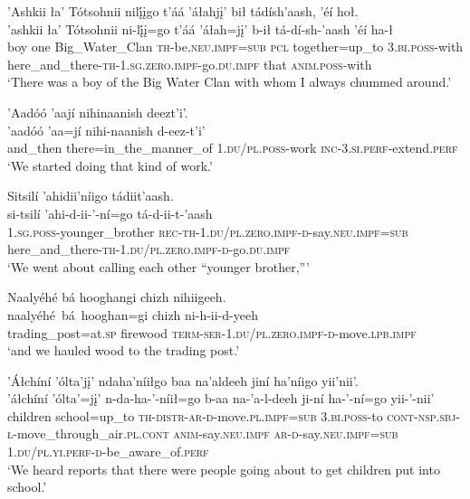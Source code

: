 \ea\label{ex:text1-11-1}
’Ashkii ła’ Tótsohnii nilį́įgo t’áá ’áłahjį’ bił tádísh’aash, ’éí hoł.\\
\gll ’ashkii	ła’	Tótsohnii	ni-lį́į=go	t’áá	’áłah=jį’	b-ił	tá-dí-sh-’aash	’éí	ha-ł\\
     boy	one	Big\_Water\_Clan	\textsc{th}-be.\textsc{neu}.\textsc{impf}=\textsc{sub}	\textsc{pcl}	together=up\_to	3.\textsc{bi}.\textsc{poss}-with	here\_and\_there-\textsc{th}-1.\textsc{sg}.\textsc{zero}.\textsc{impf}-go.\textsc{du}.\textsc{impf}	that	\textsc{anim}.\textsc{poss}-with\\
\glt `There was a boy of the Big Water Clan with whom I always chummed around.'
\z

\ea\label{ex:text1-11-2}
’Aadóó ’aají nihinaanish deezt’i’.\\
\gll ’aadóó	’aa=jí	nihi-naanish	d-eez-t’i’\\
     and\_then	there=in\_the\_manner\_of	1.\textsc{du}/\textsc{pl}.\textsc{poss}-work	\textsc{inc}-3.\textsc{si}.\textsc{perf}-extend.\textsc{perf}\\
\glt `We started doing that kind of work.'
\z

\ea\label{ex:text1-11-3}
Sitsilí ’ahidii’níigo tádiit’aash.\\
\gll si-tsilí	’ahi-d-ii-’-ní=go	tá-d-ii-t-’aash\\
     1.\textsc{sg}.\textsc{poss}-younger\_brother	\textsc{rec}-\textsc{th}-1.\textsc{du}/\textsc{pl}.\textsc{zero}.\textsc{impf}-\textsc{d}-say.\textsc{neu}.\textsc{impf}=\textsc{sub}	here\_and\_there-\textsc{th}-1.\textsc{du}/\textsc{pl}.\textsc{zero}.\textsc{impf}-\textsc{d}-go.\textsc{du}.\textsc{impf}\\
\glt `We went about calling each other ``younger brother,'''
\z

\newpage
\ea\label{ex:text1-11-4}
Naalyéhé bá hooghangi chizh nihiigeeh.\\
\gll naalyéhé~bá~{hooghan=gi}	chizh	ni-h-ii-d-yeeh\\
     trading\_post=at.\textsc{sp}	firewood	\textsc{term}-\textsc{ser}-1.\textsc{du}/\textsc{pl}.\textsc{zero}.\textsc{impf}-\textsc{d}-move.\textsc{lpb}.\textsc{impf}\\
\glt `and we hauled wood to the trading post.'
\z

\ea\label{ex:text1-11-5}
’Áłchíní ’ólta’jį’ ndaha’níiłgo baa na’aldeeh jiní ha’níigo yii’nii’.\\
\gll ’áłchíní	’ólta’=jį’	n-da-ha-’-níił=go	b-aa	na-’a-l-deeh	ji-ní	ha-’-ní=go	yii-’-nii’\\
     children	school=up\_to	\textsc{th}-\textsc{distr}-\textsc{ar}-\textsc{d}-move.\textsc{pl}.\textsc{impf}=\textsc{sub}	3.\textsc{bi}.\textsc{poss}-to	\textsc{cont}-\textsc{nsp}.\textsc{sbj}-\textsc{l}-move\_through\_air.\textsc{pl}.\textsc{cont}	\textsc{anim}-say.\textsc{neu}.\textsc{impf}	\textsc{ar}-\textsc{d}-say.\textsc{neu}.\textsc{impf}=\textsc{sub}	1.\textsc{du}/\textsc{pl}.\textsc{yi}.\textsc{perf}-\textsc{d}-be\_aware\_of.\textsc{perf}\\
\glt `We heard reports that there were people going about to get children put into school.'
\z


